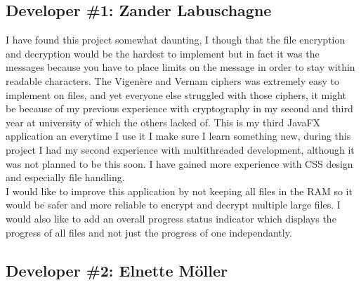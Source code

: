 \documentclass[11pt]{article}
\begin{document}
		\subsection{Developer \#1: Zander Labuschagne}
		I have found this project somewhat daunting, I though that the file encryption and decryption would be the hardest to implement but in fact it was the messages because you have to place limits on the message in order to stay within readable characters. The Vigen\`ere and Vernam ciphers was extremely easy to implement on files, and yet everyone else struggled with those ciphers, it might be because of my previous experience with cryptography in my second and third year at university of which the others lacked of. This is my third JavaFX application an everytime I use it I make sure I learn something new, during this project I had my second experience with multithreaded development, although it was not planned to be this soon. I have gained more experience with CSS design and especially file handling.\\

		I would like to improve this application by not keeping all files in the RAM so it would be safer and more reliable to encrypt and decrypt multiple large files. I would also like to add an overall progress status indicator which displays the progress of all files and not just the progress of one independantly.

		\subsection{Developer \#2: Elnette M\"oller}

		\newpage
		
		
		\thispagestyle{plain}
		\clearpage
\end{document}
